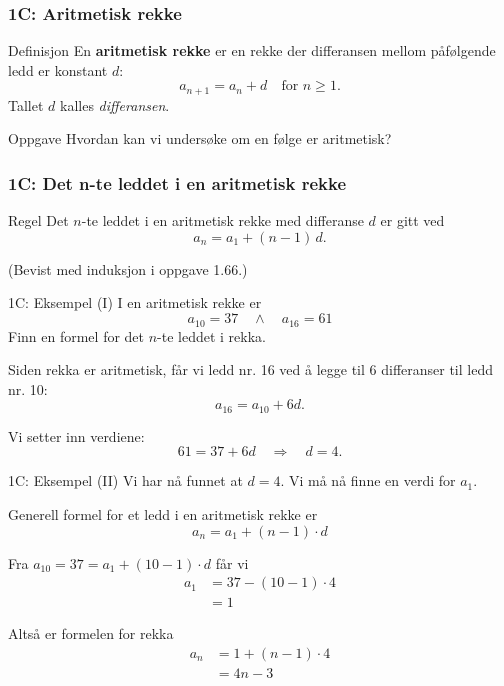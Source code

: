 \blueheader
\begin{frame}
\frametitle{1C: Aritmetisk rekke }

\begin{blue*}{Definisjon}
En \textbf{aritmetisk rekke} er en rekke der differansen mellom påfølgende ledd er konstant $d$:
\begin{equation*}
a_{n+1} = a_n + d \quad \text{for } n \ge 1.
\end{equation*}
Tallet $d$ kalles \emph{differansen}.
\end{blue*}

\begin{cyan*}{Oppgave}
Hvordan kan vi undersøke om en følge er aritmetisk?

\end{cyan*}

\end{frame}

\blueheader
\begin{frame}
\frametitle{1C: Det n-te leddet i en aritmetisk rekke}

\begin{red*}{Regel}
Det $n$-te leddet i en aritmetisk rekke med differanse $d$ er gitt ved
\[
a_n = a_1 + (n-1)\,d.
\]

(Bevist med induksjon i oppgave 1.66.)
\end{red*}

\end{frame}

\greenheader
\begin{frame}{1C: Eksempel (I)}
I en aritmetisk rekke er 
\[
a_{10} = 37 \quad \wedge \quad a_{16} = 61
\]
Finn en formel for det $n$-te leddet i rekka.

\medskip
Siden rekka er aritmetisk, får vi ledd nr. 16 ved å legge til 6 differanser til ledd nr. 10:
\[
a_{16} = a_{10} + 6d.
\]

Vi setter inn verdiene:
\[
61 = 37 + 6d \quad \Rightarrow \quad d = 4.
\]
\end{frame}

\greenheader
\begin{frame}{1C: Eksempel (II)}
Vi har nå funnet at $d=4$. Vi må nå finne en verdi for $a_1$.

\medskip
Generell formel for et ledd i en aritmetisk rekke er
\[
a_n = a_1 + (n-1)\cdot d
\]

Fra $a_{10} = 37 = a_1 + (10-1)\cdot d $ får vi
\begin{align*}
a_1 &= 37 - (10-1)\cdot 4\\ 
&= 1
\end{align*}

\medskip
Altså er formelen for rekka
\begin{align*}
a_n &= 1 + (n-1)\cdot 4\\ &= 4n - 3
\end{align*}
\end{frame}



